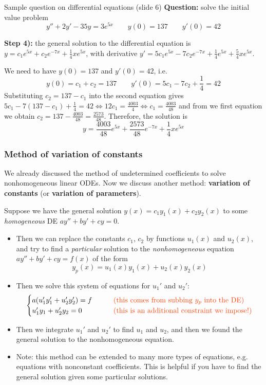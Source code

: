 \begin{frame}{Sample question on differential equations (slide 6)}
    \textbf{Question:} solve the initial value problem \[y''+2y'-35y=3e^{5x}\qquad y(0)=137\qquad y'(0)=42\]
    
    \textbf{Step 4):} the general solution to the differential equation is
    $y=c_1e^{5x} + c_2e^{-7x} +\frac{1}{4}xe^{5x}$\pause, with derivative $y'=5c_1e^{5x}-7c_2e^{-7x}+\frac{1}{4}e^{5x}+\frac{5}{4}xe^{5x}$.

    We need to have $y(0)=137$ and $y'(0)=42$\pause, i.e.
    \[y(0)=c_1+c_2=137\qquad y'(0)=5c_1-7c_2+\frac{1}{4}=42\]\pause
    Substituting $c_2=137-c_1$ into the second equation gives $5c_1-7(137-c_1)+\frac{1}{4}=42 \iff 12c_1=\frac{4003}{4} \iff c_1=\frac{4003}{48}$ and from we first equation we obtain $c_2=137-\frac{4003}{48}=\frac{2573}{48}$. Therefore, the solution is \[\boxed{\boxed{y=\frac{4003}{48}e^{5x} + \frac{2573}{48}e^{-7x} +\frac{1}{4}xe^{5x}}}\]

    

\end{frame}



\begin{frame}
	\frametitle{Method of variation of constants}{\scriptsize
        We already discussed the method of undetermined coefficients to solve nonhomogeneous linear ODEs. Now we discuss another method: \textbf{variation of constants} (or \textbf{variation of parameters}).

		\pause Suppose we have the general solution $y(x)=c_1y_1(x)+c_2y_2(x)$
		to some \textit{homogeneous} DE $ay''+by'+cy=0$.
		\begin{itemize}
			\pause	\item Then we can replace the constants $c_1$, $c_2$ by functions $u_1(x)$ and $u_2(x)$, and try to find a \textit{particular} solution to the \textit{nonhomogeneous} equation $ay''+by'+cy=f(x)$ of the form
			      \[y_p(x)=u_1(x)y_1(x)+u_2(x)y_2(x)\]

			      \pause\item Then we solve this system of equations for $u_1'$ and $u_2'$:
			      $$\begin{cases}a(u_1'y_1'+u_2'y_2')=f\qquad&\text{\color{orange!50!red}(this comes from subbing $y_p$ into the DE)}\\u_1'y_1 + u_2'y_2=0&\text{\color{orange!50!red}(this is an additional constraint we impose!)}\end{cases}$$
			      \pause\item Then we integrate $u_1'$ and $u_2'$ to find $u_1$ and $u_2$, and then we found the general solution to the nonhomogeneous equation.
			      \pause\item Note: this method can be extended to many more types of equations, e.g. equations with nonconstant coefficients. This is helpful if you have to find the general solution given some particular solutions.
		\end{itemize}}
\end{frame}

